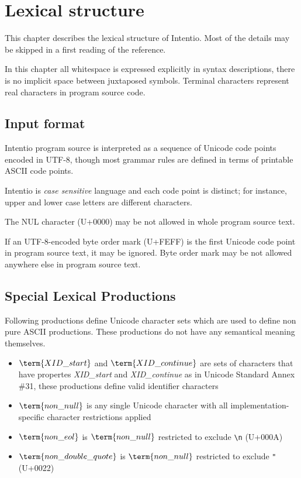 \chapter{Lexical structure}

This chapter describes the lexical structure of Intentio. Most of the details may be skipped in a first reading of the reference.

In this chapter all whitespace is expressed explicitly in syntax descriptions, there is no implicit space between juxtaposed symbols. Terminal characters represent real characters in program source code.

\section{Input format}

Intentio program source is interpreted as a sequence of Unicode code points encoded in UTF-8, though most grammar rules are defined in terms of printable ASCII code points.

Intentio is \emph{case sensitive} language and each code point is distinct; for instance, upper and lower case letters are different characters.

The NUL character (U+0000) may be not allowed in whole program source text.

If an UTF-8-encoded byte order mark (U+FEFF) is the first Unicode code point in program source text, it may be ignored. Byte order mark may be not allowed anywhere else in program source text.

\section{Special Lexical Productions}

Following productions define Unicode character sets which are used to define non pure ASCII productions. These productions do not have any semantical meaning themselves.

\begin{bnfutils}
\begin{itemize}
  \item \(\term{XID\_start}\) and \(\term{XID\_continue}\) are sets of characters that have propertes \emph{XID\_start} and \emph{XID\_continue} as in Unicode Standard Annex \#31\cite{UAX31}, these productions define valid identifier characters
  \item \(\term{non\_null}\) is any single Unicode character with all implementation-specific character restrictions applied
  \item \(\term{non\_eol}\) is \(\term{non\_null}\) restricted to exclude \texttt{\textbackslash n} (U+000A)
  \item \(\term{non\_double\_quote}\) is \(\term{non\_null}\) restricted to exclude \texttt{"} (U+0022)
\end{itemize}
\end{bnfutils}
